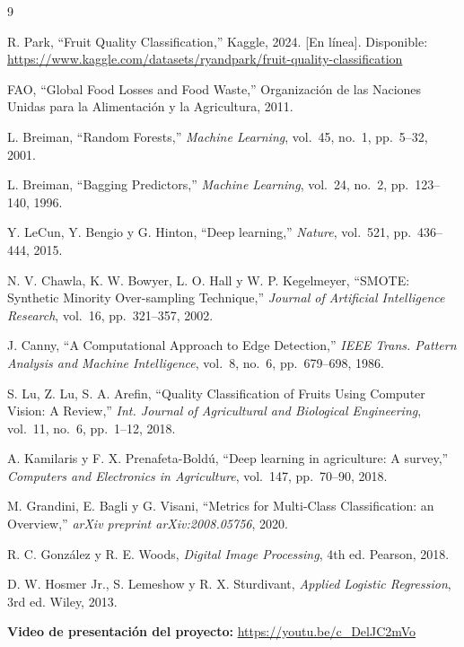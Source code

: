 \documentclass[conference]{IEEEtran}
\begin{document}

\begin{thebibliography}{9}

R. Park, ``Fruit Quality Classification,'' Kaggle, 2024. [En línea]. Disponible: \url{https://www.kaggle.com/datasets/ryandpark/fruit-quality-classification}

FAO, ``Global Food Losses and Food Waste,'' Organización de las Naciones Unidas para la Alimentación y la Agricultura, 2011.

L. Breiman, ``Random Forests,'' \textit{Machine Learning}, vol.~45, no.~1, pp.~5--32, 2001.

L. Breiman, ``Bagging Predictors,'' \textit{Machine Learning}, vol.~24, no.~2, pp.~123--140, 1996.

Y. LeCun, Y. Bengio y G. Hinton, ``Deep learning,'' \textit{Nature}, vol.~521, pp.~436--444, 2015.

N. V. Chawla, K. W. Bowyer, L. O. Hall y W. P. Kegelmeyer, ``SMOTE: Synthetic Minority Over-sampling Technique,'' \textit{Journal of Artificial Intelligence Research}, vol.~16, pp.~321--357, 2002.

J. Canny, ``A Computational Approach to Edge Detection,'' \textit{IEEE Trans. Pattern Analysis and Machine Intelligence}, vol.~8, no.~6, pp.~679--698, 1986.

S. Lu, Z. Lu, S. A. Arefin, ``Quality Classification of Fruits Using Computer Vision: A Review,'' \textit{Int. Journal of Agricultural and Biological Engineering}, vol.~11, no.~6, pp.~1--12, 2018.

A. Kamilaris y F. X. Prenafeta-Boldú, ``Deep learning in agriculture: A survey,'' \textit{Computers and Electronics in Agriculture}, vol.~147, pp.~70--90, 2018.

M. Grandini, E. Bagli y G. Visani, ``Metrics for Multi-Class Classification: an Overview,'' \textit{arXiv preprint arXiv:2008.05756}, 2020.

R. C. González y R. E. Woods, \textit{Digital Image Processing}, 4th ed. Pearson, 2018.

D. W. Hosmer Jr., S. Lemeshow y R. X. Sturdivant, \textit{Applied Logistic Regression}, 3rd ed. Wiley, 2013.

\end{thebibliography}

\vspace{0.5cm}
\noindent\textbf{Video de presentación del proyecto:} \url{https://youtu.be/c_DelJC2mVo}
\end{document}

